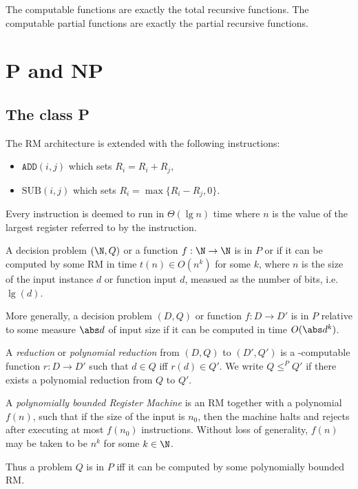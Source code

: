 \documentclass{article}
\begin{document}
\begin{theorem*}[Notes I.45]
	The computable functions are exactly the total recursive functions. The computable partial functions
	are exactly the partial recursive functions.
\end{theorem*}

\section{P and NP}

\subsection{The class P}

\begin{definition*}
	The RM architecture is extended with the following instructions:
	\begin{itemize}
		\item $\texttt{ADD}(i,j)$ which sets $R_i=R_i+R_j$,
		\item $\text{SUB}(i,j)$ which sets $R_i=\max\{R_i-R_j,0\}$.
	\end{itemize}
	Every instruction is deemed to run in $\Theta(\lg n)$ time where $n$
	is the value of the largest register referred to by the instruction.
\end{definition*}


\begin{definition*}
	A decision problem $(\N,Q)$ or a function $f:\N\to\N$ is in $P$ or \ptime if
	it can be computed by some RM in time $t(n)\in O(n^k)$ for some $k$, where $n$ is the size
	of the input instance $d$ or function input $d$, measued as the number of bits, i.e. $\lg(d)$.

	More generally, a decision problem $(D,Q)$ or function $f:D\to D'$ is in $P$ relative to some
	measure $\abs d$ of input size if it can be computed in time $O(\abs d^k)$.
\end{definition*}

\begin{definition*}
	A \ptime \emph{reduction} or \emph{polynomial reduction} from $(D,Q)$ to $(D',Q')$ is
	a \ptime-computable function $r:D\to D'$ such that $d\in Q$ iff $r(d)\in Q'$.
	We write $Q\leq^P Q'$ if there exists a polynomial reduction from $Q$ to $Q'$.
\end{definition*}

\begin{definition*}
	A \emph{polynomially bounded Register Machine} is an RM together with a polynomial $f(n)$,
	such that if the size of the input is $n_0$, then the machine halts and rejects after
	executing at most $f(n_0)$ instructions. Without loss of generality, $f(n)$ may be taken to be
	$n^k$ for some $k\in\N$.

	Thus a problem $Q$ is in $P$ iff it can be computed by some polynomially bounded RM.
\end{definition*}
\end{document}
